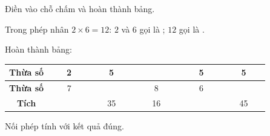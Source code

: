 \documentclass[../main.tex]{subfiles}
\begin{document}
\begin{bt}
    Điền vào chỗ chấm và hoàn thành bảng.
    \par\nopagebreak\vspace{2pt}
    \begin{listEX}
        \item Trong phép nhân $2\times6=12$: $2$ và $6$ gọi là \TTcham[2.2cm]; $12$ gọi là \TTcham[2.2cm].
        \item Hoàn thành bảng:
    \end{listEX}
    \par\nopagebreak\vspace{2pt}
    {\centering
    \renewcommand{\arraystretch}{1.6}
    \begin{tabular}{|c|c|c|c|c|c|}
        \hline
        \textbf{Thừa số} & 2 & 5 & \ \ \ \ \ \ \ \ & 5 & 5 \\
        \hline
        \textbf{Thừa số} & 7 & \ \ \ \ \ \ \ \ & 8 & 6 & \ \ \ \ \ \ \ \ \\
        \hline
        \textbf{Tích} & \ \ \ \ \ \ \ \ & 35 & 16 & \ \ \ \ \ \ \ \ & 45 \\
        \hline
    \end{tabular}\par}
\end{bt}

\begin{bt}
    Nối phép tính với kết quả đúng.
    \TTbatdauhinh
    {\centering
    \par}
\end{bt}
\end{document}
